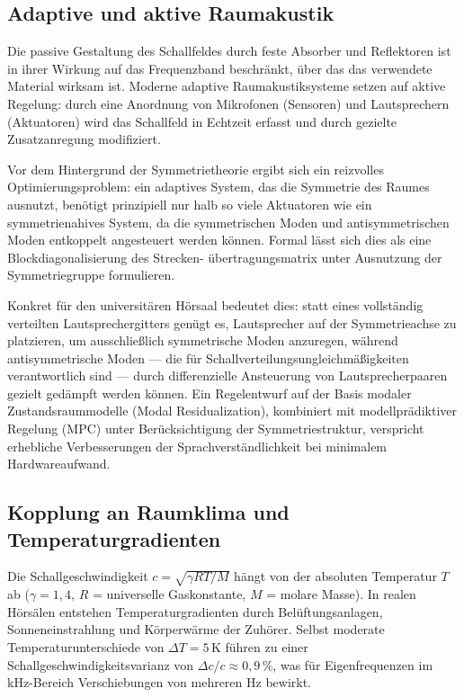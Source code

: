 ﻿\documentclass[12pt, a4paper]{article}
\theoremstyle{definition}
\theoremstyle{remark}
\begin{document}
\subsection{Adaptive und aktive Raumakustik}

Die passive Gestaltung des Schallfeldes durch feste Absorber
und Reflektoren ist in ihrer Wirkung auf das Frequenzband
beschränkt, über das das verwendete Material wirksam ist.
Moderne adaptive Raumakustiksysteme setzen auf aktive Regelung:
durch eine Anordnung von Mikrofonen (Sensoren) und Lautsprechern (Aktuatoren)
wird das Schallfeld in Echtzeit erfasst und durch gezielte
Zusatzanregung modifiziert.

Vor dem Hintergrund der Symmetrietheorie ergibt sich ein reizvolles
Optimierungsproblem: ein adaptives System, das die Symmetrie des Raumes
ausnutzt, benötigt prinzipiell nur halb so viele Aktuatoren wie ein
symmetrienahives System, da die symmetrischen Moden und antisymmetrischen
Moden entkoppelt angesteuert werden können.
Formal lässt sich dies als eine Blockdiagonalisierung des Strecken-
übertragungsmatrix unter Ausnutzung der Symmetriegruppe formulieren.

Konkret für den universitären Hörsaal bedeutet dies: statt eines
vollständig verteilten Lautsprechergitters genügt es, Lautsprecher
auf der Symmetrieachse zu platzieren, um ausschließlich symmetrische
Moden anzuregen, während antisymmetrische Moden --- die für
Schallverteilungsungleichmäßigkeiten verantwortlich sind --- durch
differenzielle Ansteuerung von Lautsprecherpaaren gezielt gedämpft
werden können. Ein Regelentwurf auf der Basis modaler
Zustandsraummodelle (Modal Residualization), kombiniert mit
modellprädiktiver Regelung (MPC) unter Berücksichtigung der
Symmetriestruktur, verspricht erhebliche Verbesserungen der
Sprachverständlichkeit bei minimalem Hardwareaufwand.

\subsection{Kopplung an Raumklima und Temperaturgradienten}

Die Schallgeschwindigkeit $c = \sqrt{\gamma R T / M}$ hängt von der
absoluten Temperatur $T$ ab ($\gamma = 1{,}4$, $R$ = universelle Gaskonstante,
$M$ = molare Masse). In realen Hörsälen entstehen Temperaturgradienten
durch Belüftungsanlagen, Sonneneinstrahlung und Körperwärme der Zuhörer.
Selbst moderate Temperaturunterschiede von $\Delta T = 5\,\mathrm{K}$
führen zu einer Schallgeschwindigkeitsvarianz von $\Delta c / c \approx 0{,}9\,\%$,
was für Eigenfrequenzen im kHz-Bereich Verschiebungen von mehreren Hz
bewirkt.
\end{document}
